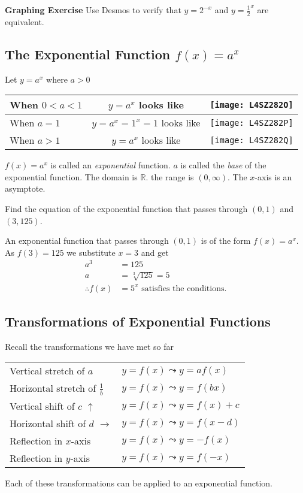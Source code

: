 \textbf{Graphing Exercise} Use Desmos to verify that $y =2^{-x}$ and $y =\frac{1}{2}^x$ are equivalent. 

\subsection*{The Exponential Function $f(x)=a^x$}
Let $y =a^{x}$ where $a >0$ 

\begin{center}
\begin{tabular}{lcl}
	\toprule
	When $0 <a <1$  & $y =a^{x}$ looks like  &    
	\texttt{[image: L4SZ282O]}
	\\
	\midrule
	When $a =1$  & $y =a^{x} =1^{x} =1$ looks like  &    
	\texttt{[image: L4SZ282P]}
	\\
	\midrule
	When $a >1$  & $y =a^{x}$ looks like  &    
\texttt{[image: L4SZ282Q]}
	\\
	\bottomrule
\end{tabular}
\end{center}

$f (x) =a^{x}$ is called an \emph{exponential} function. $a$ is called the \emph{base} of the exponential function. The domain
is $\mathbb{R}$. the range is $\left (0 ,\infty \right )$. The $x$-axis is an asymptote. 

\example Find the equation of the exponential function that passes through $\left (0 ,1\right )$ and $\left (3 ,125\right )$. 

\solution An exponential function that passes through $\left (0 ,1\right )$ is of the form $f (x) =a^{x}$. As $f (3) =125$ we substitute $x =3$ and get
\begin{align*}a^{3} &  = 125 \\
a &  = \sqrt[{3}]{125} =5\\
\therefore f(x)&=5^x \text{ satisfies the conditions.}
\end{align*}

\subsection*{Transformations of Exponential Functions}
Recall the transformations we have met so far 

\begin{center}
\begin{tabular}{ll}Vertical stretch of $a$  & $y =f (x) \leadsto y =a f (x)$  \\
	Horizontal stretch of $\frac{1}{b}$  & $y =f (x) \leadsto y =f (b x)$  \\
	Vertical shift of $c$ $\uparrow $  & $y =f (x) \leadsto y =f (x) +c$  \\
	Horizontal shift of $d$ $ \longrightarrow $  & $y =f (x) \leadsto y =f (x -d)$  \\
	Reflection in $x$-axis  & $y =f (x) \leadsto y = -f (x)$  \\
	Reflection in $y$-axis  & $y =f (x) \leadsto y =f ( -x)$
\end{tabular}
\end{center}
Each of these transformations can be applied to an exponential
function. 

